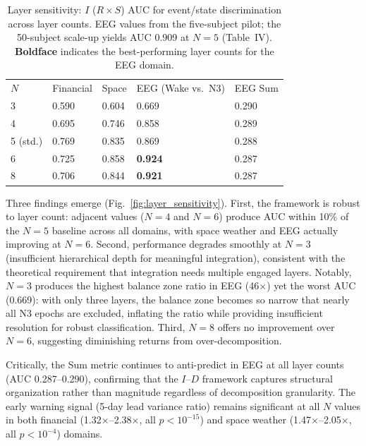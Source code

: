 \documentclass[aip,cha,reprint,amsmath,amssymb,final]{revtex4-2}
\begin{document}
\begin{table}[!htbp]
\caption[Layer sensitivity showing I AUC for event discrimination across layer counts 3 through 8]{\label{tab:layers_sensitivity}Layer sensitivity: $I$ ($R \times S$) AUC for event/state discrimination across layer counts. EEG values from the five-subject pilot; the 50-subject scale-up yields AUC 0.909 at $N=5$ (Table~IV). \textbf{Boldface} indicates the best-performing layer counts for the EEG domain.}
\begin{ruledtabular}
\begin{tabular}{lllll}
$N$ & Financial & Space & EEG (Wake vs.\ N3) & EEG Sum \\
3 & 0.590 & 0.604 & 0.669 & 0.290 \\
4 & 0.695 & 0.746 & 0.858 & 0.289 \\
5 (std.) & 0.769 & 0.835 & 0.869 & 0.288 \\
6 & 0.725 & 0.858 & \textbf{0.924} & 0.287 \\
8 & 0.706 & 0.844 & \textbf{0.921} & 0.287 \\
\end{tabular}
\end{ruledtabular}
\end{table}

Three findings emerge (Fig.~\ref{fig:layer_sensitivity}). First, the framework is robust to layer count: adjacent values ($N = 4$ and $N = 6$) produce AUC within 10\% of the $N = 5$ baseline across all domains, with space weather and EEG actually improving at $N = 6$. Second, performance degrades smoothly at $N = 3$ (insufficient hierarchical depth for meaningful integration), consistent with the theoretical requirement that integration needs multiple engaged layers. Notably, $N = 3$ produces the highest balance zone ratio in EEG (46$\times$) yet the worst AUC (0.669): with only three layers, the balance zone becomes so narrow that nearly all N3 epochs are excluded, inflating the ratio while providing insufficient resolution for robust classification. Third, $N = 8$ offers no improvement over $N = 6$, suggesting diminishing returns from over-decomposition.

Critically, the Sum metric continues to anti-predict in EEG at all layer counts (AUC 0.287--0.290), confirming that the $I$--$D$ framework captures structural organization rather than magnitude regardless of decomposition granularity. The early warning signal (5-day lead variance ratio) remains significant at all $N$ values in both financial (1.32$\times$--2.38$\times$, all $p < 10^{-15}$) and space weather (1.47$\times$--2.05$\times$, all $p < 10^{-4}$) domains.
\end{document}
